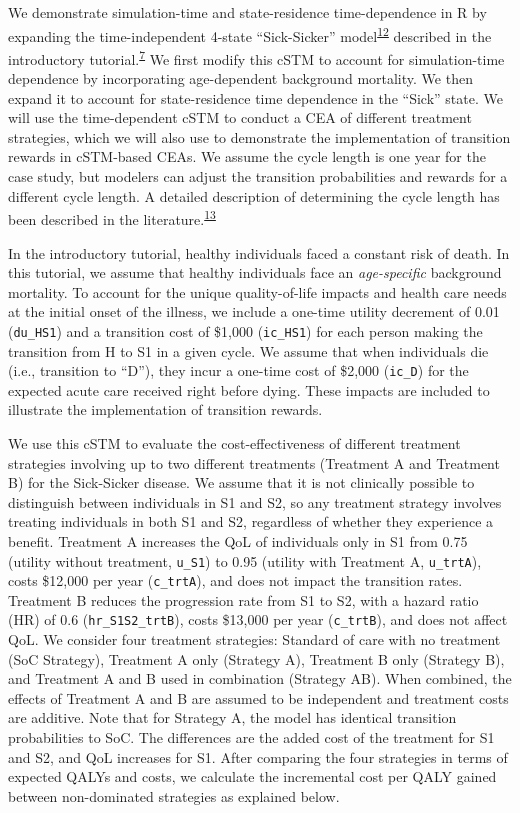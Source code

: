 \documentclass[
]{article}
\begin{document}
We demonstrate simulation-time and state-residence time-dependence in R by expanding the time-independent 4-state ``Sick-Sicker'' model\textsuperscript{\protect\hyperlink{ref-Enns2015e}{12}} described in the introductory tutorial.\textsuperscript{\protect\hyperlink{ref-Alarid-Escudero2022b}{7}} We first modify this cSTM to account for simulation-time dependence by incorporating age-dependent background mortality. We then expand it to account for state-residence time dependence in the ``Sick'' state. We will use the time-dependent cSTM to conduct a CEA of different treatment strategies, which we will also use to demonstrate the implementation of transition rewards in cSTM-based CEAs. We assume the cycle length is one year for the case study, but modelers can adjust the transition probabilities and rewards for a different cycle length. A detailed description of determining the cycle length has been described in the literature.\textsuperscript{\protect\hyperlink{ref-OMahony2015}{13}}

In the introductory tutorial, healthy individuals faced a constant risk of death. In this tutorial, we assume that healthy individuals face an \emph{age-specific} background mortality. To account for the unique quality-of-life impacts and health care needs at the initial onset of the illness, we include a one-time utility decrement of 0.01 (\texttt{du\_HS1}) and a transition cost of \$1,000 (\texttt{ic\_HS1}) for each person making the transition from H to S1 in a given cycle. We assume that when individuals die (i.e., transition to ``D''), they incur a one-time cost of \$2,000 (\texttt{ic\_D}) for the expected acute care received right before dying. These impacts are included to illustrate the implementation of transition rewards.

We use this cSTM to evaluate the cost-effectiveness of different treatment strategies involving up to two different treatments (Treatment A and Treatment B) for the Sick-Sicker disease. We assume that it is not clinically possible to distinguish between individuals in S1 and S2, so any treatment strategy involves treating individuals in both S1 and S2, regardless of whether they experience a benefit. Treatment A increases the QoL of individuals only in S1 from 0.75 (utility without treatment, \texttt{u\_S1}) to 0.95 (utility with Treatment A, \texttt{u\_trtA}), costs \$12,000 per year (\texttt{c\_trtA}), and does not impact the transition rates. Treatment B reduces the progression rate from S1 to S2, with a hazard ratio (HR) of 0.6 (\texttt{hr\_S1S2\_trtB}), costs \$13,000 per year (\texttt{c\_trtB}), and does not affect QoL. We consider four treatment strategies: Standard of care with no treatment (SoC Strategy), Treatment A only (Strategy A), Treatment B only (Strategy B), and Treatment A and B used in combination (Strategy AB). When combined, the effects of Treatment A and B are assumed to be independent and treatment costs are additive. Note that for Strategy A, the model has identical transition probabilities to SoC. The differences are the added cost of the treatment for S1 and S2, and QoL increases for S1. After comparing the four strategies in terms of expected QALYs and costs, we calculate the incremental cost per QALY gained between non-dominated strategies as explained below.
\end{document}
